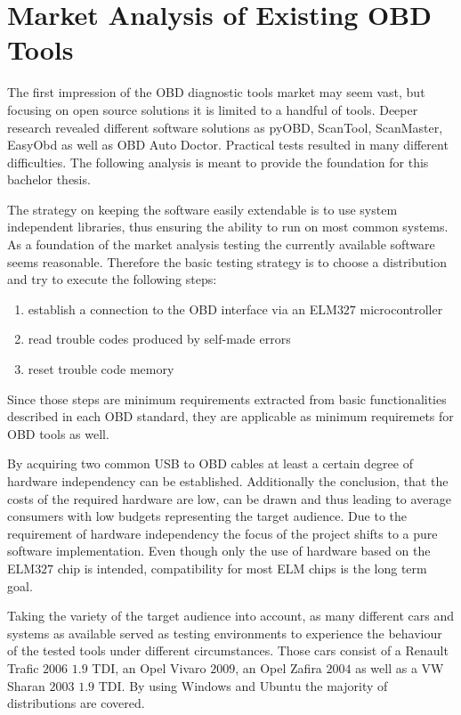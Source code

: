 \section{Market Analysis of Existing OBD Tools}
The first impression of the OBD diagnostic tools market may seem vast, but focusing on open source solutions it is limited to a handful of tools.
Deeper research revealed different software solutions as pyOBD, ScanTool, ScanMaster, EasyObd as well as OBD Auto Doctor. 
Practical tests resulted in many different difficulties. The following analysis is meant to provide the foundation for this bachelor 
thesis. 

The strategy on keeping the software easily extendable is to use system independent libraries, thus 
ensuring the ability to run on most common systems. As a foundation of the market analysis testing the currently available software seems reasonable. 
Therefore the basic testing strategy is to choose a distribution and try to execute the following steps:

\begin{enumerate}
 \item establish a connection to the OBD interface via an ELM$327$ microcontroller 
 \item read trouble codes produced by self-made errors
 \item reset trouble code memory
\end{enumerate}

Since those steps are minimum requirements extracted from basic functionalities described in each OBD standard, they are applicable as minimum 
requiremets for OBD tools as well. 

By acquiring two common USB to OBD cables at least a certain degree of hardware independency can be established. 
Additionally the conclusion, that the costs of the required hardware are low, can be drawn and thus leading to average consumers with low budgets 
representing the target audience. Due to the requirement of hardware independency the focus of the project shifts to a pure software implementation. 
Even though only the use of hardware based on the ELM$327$ chip is intended, compatibility for most ELM chips is the long term goal. 

Taking the variety of the target audience into account, as many different cars and systems as available served as testing environments to experience 
the behaviour of the tested tools under different circumstances. Those cars consist of a Renault Trafic $2006$ $1.9$ TDI, an Opel Vivaro $2009$, 
an Opel Zafira $2004$ as well as a VW Sharan $2003$ $1.9$ TDI. By using Windows and Ubuntu the majority of distributions are covered.

